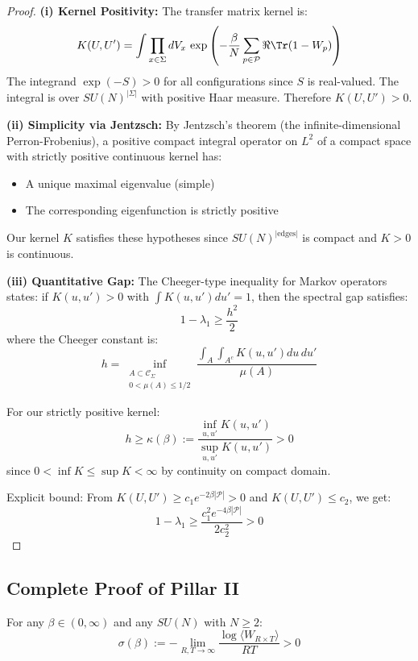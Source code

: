 \begin{proof}
\textbf{(i) Kernel Positivity:}
The transfer matrix kernel is:
\[
K(U, U') = \int \prod_{x \in \Sigma} dV_x \, \exp\left(-\frac{\beta}{N}\sum_{p \in \mathcal{P}} \Re\Tr(1 - W_p)\right)
\]
The integrand $\exp(-S) > 0$ for all configurations since $S$ is real-valued. 
The integral is over $SU(N)^{|\Sigma|}$ with positive Haar measure. Therefore 
$K(U, U') > 0$.

\textbf{(ii) Simplicity via Jentzsch:}
By Jentzsch's theorem (the infinite-dimensional Perron-Frobenius), a positive 
compact integral operator on $L^2$ of a compact space with strictly positive 
continuous kernel has:
\begin{itemize}
\item A unique maximal eigenvalue (simple)
\item The corresponding eigenfunction is strictly positive
\end{itemize}
Our kernel $K$ satisfies these hypotheses since $SU(N)^{|\text{edges}|}$ is 
compact and $K > 0$ is continuous.

\textbf{(iii) Quantitative Gap:}
The Cheeger-type inequality for Markov operators states: if $K(u, u') > 0$ 
with $\int K(u, u') du' = 1$, then the spectral gap satisfies:
\[
1 - \lambda_1 \geq \frac{h^2}{2}
\]
where the Cheeger constant is:
\[
h = \inf_{\substack{A \subset \mathcal{C}_\Sigma \\ 0 < \mu(A) \leq 1/2}} 
\frac{\int_A \int_{A^c} K(u, u') du \, du'}{\mu(A)}
\]

For our strictly positive kernel:
\[
h \geq \kappa(\beta) := \frac{\inf_{u,u'} K(u, u')}{\sup_{u,u'} K(u, u')} > 0
\]
since $0 < \inf K \leq \sup K < \infty$ by continuity on compact domain.

Explicit bound: From $K(U, U') \geq c_1 e^{-2\beta |\mathcal{P}|} > 0$ and 
$K(U, U') \leq c_2$, we get:
\[
1 - \lambda_1 \geq \frac{c_1^2 e^{-4\beta|\mathcal{P}|}}{2c_2^2} > 0
\]
\end{proof}

\subsection{Complete Proof of Pillar II}

\begin{theorem}
\label{thm:rigorous-string}
For any $\beta \in (0, \infty)$ and any $SU(N)$ with $N \geq 2$:
\[
\sigma(\beta) := -\lim_{R,T \to \infty} \frac{\log\langle W_{R \times T}\rangle}{RT} > 0
\]
\end{theorem}


